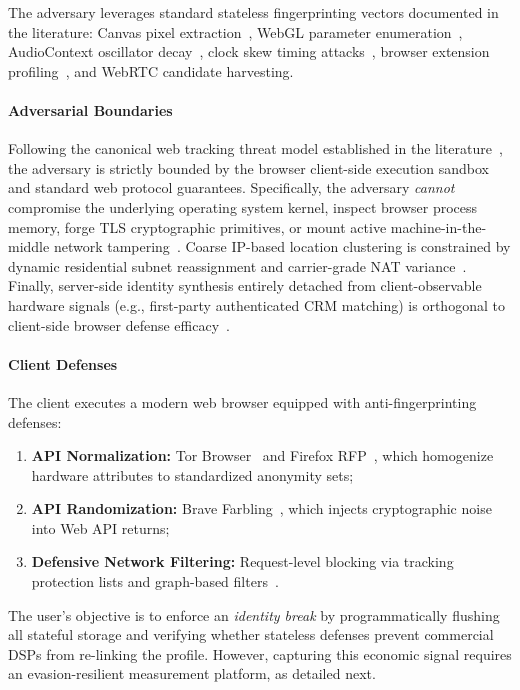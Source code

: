 The adversary leverages standard stateless fingerprinting vectors documented in the literature: Canvas pixel extraction~\cite{mowery2012pixel, acar2014web}, WebGL parameter enumeration~\cite{cao2017cross}, AudioContext oscillator decay~\cite{englehardt2016openwpm, laperdrix2020browser}, clock skew timing attacks~\cite{sanchez2018clock}, browser extension profiling~\cite{starov2019unnecessarily}, and WebRTC candidate harvesting.

\paragraph{Adversarial Boundaries}
Following the canonical web tracking threat model established in the literature~\cite{tor_design, englehardt2016openwpm, laperdrix2020browser}, the adversary is strictly bounded by the browser client-side execution sandbox and standard web protocol guarantees. 
Specifically, the adversary \textit{cannot} compromise the underlying operating system kernel, inspect browser process memory, forge TLS cryptographic primitives, or mount active machine-in-the-middle network tampering~\cite{bujlow2017survey}. 
Coarse IP-based location clustering is constrained by dynamic residential subnet reassignment and carrier-grade NAT variance~\cite{eckersley2010unique, englehardt2016openwpm}. 
Finally, server-side identity synthesis entirely detached from client-observable hardware signals (e.g., first-party authenticated CRM matching) is orthogonal to client-side browser defense efficacy~\cite{bashir2016tracing, cook2020inferring}.

\paragraph{Client Defenses}
The client executes a modern web browser equipped with anti-fingerprinting defenses:
\begin{enumerate}
    \item \textbf{API Normalization:} Tor Browser~\cite{tor_design, torbrowser_normalization_2019} and Firefox RFP~\cite{mozilla_rfp_docs}, which homogenize hardware attributes to standardized anonymity sets;
    \item \textbf{API Randomization:} Brave Farbling~\cite{brave_fingerprinting_protections_2025}, which injects cryptographic noise into Web API returns;
    \item \textbf{Defensive Network Filtering:} Request-level blocking via tracking protection lists and graph-based filters~\cite{iqbal2020adgraph}.
\end{enumerate}

The user's objective is to enforce an \textit{identity break} by programmatically flushing all stateful storage and verifying whether stateless defenses prevent commercial DSPs from re-linking the profile. 
However, capturing this economic signal requires an evasion-resilient measurement platform, as detailed next.